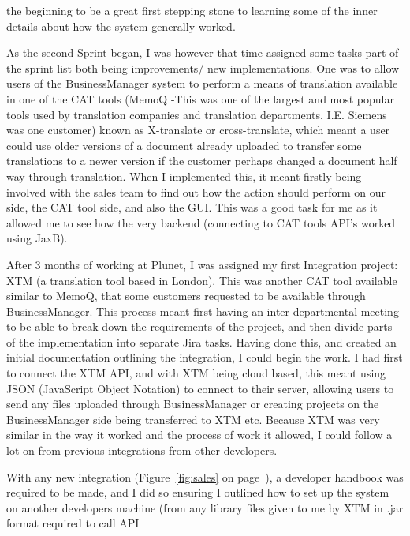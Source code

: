 \documentclass[12pt]{article}
\begin{document}
the beginning to be a great first stepping stone to learning some of the inner details about how the system generally
worked.\\ \par \noindent
As the second Sprint began, I was however that time assigned some tasks part of the sprint list both being improvements/
new implementations. One was to allow users of the BusinessManager system to perform a means of translation available in
one of the CAT tools (MemoQ -This was one of the largest and most popular tools used by translation companies and
translation departments. I.E. Siemens was one customer) known as X-translate or cross-translate, which meant a user
could use older versions of a document already uploaded to transfer some translations to a newer version if the customer
perhaps changed a document half way through translation. When I implemented this, it meant firstly being involved with
the sales team to find out how the action should perform on our side, the CAT tool side, and also the GUI. This was a
good task for me as it allowed me to see how the very backend (connecting to CAT tools API’s worked using JaxB).\\ \par \noindent
After 3 months of working at Plunet, I was assigned my first Integration project: XTM (a translation tool based in
London). This was another CAT tool available similar to MemoQ, that some customers requested to be available through 
BusinessManager. This process meant first having an inter-departmental meeting to be able to break down the requirements
of the project, and then divide parts of the implementation into separate Jira tasks. Having done this, and created an
initial documentation outlining the integration, I could begin the work. I had first to connect the XTM API, and with
XTM being cloud based, this meant using JSON (JavaScript Object Notation) to connect to their server, allowing users to
send any files uploaded through BusinessManager or creating projects on the BusinessManager side being transferred to
XTM etc. Because XTM was very similar in the way it worked and the process of work it allowed, I could follow a lot on
from previous integrations from other developers.\\ \par \noindent
With any new integration (Figure~\ref{fig:sales} on page~\pageref{fig:sales}),
 a developer handbook was required to be made, and I did so ensuring I outlined how to set up
the system on another developers machine (from any library files given to me by XTM in .jar format required to call API
\end{document}
